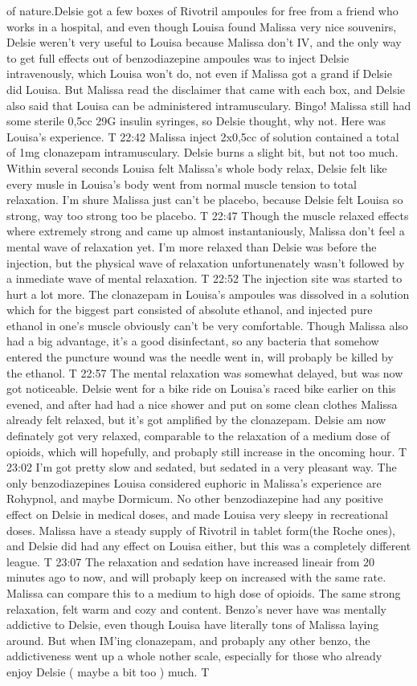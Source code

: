 \documentclass[12pt]{book}
\begin{document}
of nature.Delsie got a few boxes of Rivotril ampoules for free from a friend who works in a hospital, and even though Louisa found Malissa very nice souvenirs, Delsie weren't very useful to Louisa because Malissa don't IV, and the only way to get full effects out of benzodiazepine ampoules was to inject Delsie intravenously, which Louisa won't do, not even if Malissa got a grand if Delsie did Louisa. But Malissa read the disclaimer that came with each box, and Delsie also said that Louisa can be administered intramusculary. Bingo! Malissa still had some sterile 0,5cc 29G insulin syringes, so Delsie thought, why not. Here was Louisa's experience. T 22:42 Malissa inject 2x0,5cc of solution contained a total of 1mg clonazepam intramusculary. Delsie burns a slight bit, but not too much. Within several seconds Louisa felt Malissa's whole body relax, Delsie felt like every musle in Louisa's body went from normal muscle tension to total relaxation. I'm shure Malissa just can't be placebo, because Delsie felt Louisa so strong, way too strong too be placebo. T 22:47 Though the muscle relaxed effects where extremely strong and came up almost instantaniously, Malissa don't feel a mental wave of relaxation yet. I'm more relaxed than Delsie was before the injection, but the physical wave of relaxation unfortunenately wasn't followed by a inmediate wave of mental relaxation. T 22:52 The injection site was started to hurt a lot more. The clonazepam in Louisa's ampoules was dissolved in a solution which for the biggest part consisted of absolute ethanol, and injected pure ethanol in one's muscle obviously can't be very comfortable. Though Malissa also had a big advantage, it's a good disinfectant, so any bacteria that somehow entered the puncture wound was the needle went in, will probaply be killed by the ethanol. T 22:57 The mental relaxation was somewhat delayed, but was now got noticeable. Delsie went for a bike ride on Louisa's raced bike earlier on this evened, and after had had a nice shower and put on some clean clothes Malissa already felt relaxed, but it's got amplified by the clonazepam. Delsie am now definately got very relaxed, comparable to the relaxation of a medium dose of opioids, which will hopefully, and probaply still increase in the oncoming hour. T 23:02 I'm got pretty slow and sedated, but sedated in a very pleasant way. The only benzodiazepines Louisa considered euphoric in Malissa's experience are Rohypnol, and maybe Dormicum. No other benzodiazepine had any positive effect on Delsie in medical doses, and made Louisa very sleepy in recreational doses. Malissa have a steady supply of Rivotril in tablet form(the Roche ones), and Delsie did had any effect on Louisa either, but this was a completely different league. T 23:07 The relaxation and sedation have increased lineair from 20 minutes ago to now, and will probaply keep on increased with the same rate. Malissa can compare this to a medium to high dose of opioids. The same strong relaxation, felt warm and cozy and content. Benzo's never have was mentally addictive to Delsie, even though Louisa have literally tons of Malissa laying around. But when IM'ing clonazepam, and probaply any other benzo, the addictiveness went up a whole nother scale, especially for those who already enjoy Delsie ( maybe a bit too ) much. T 
\end{document}
